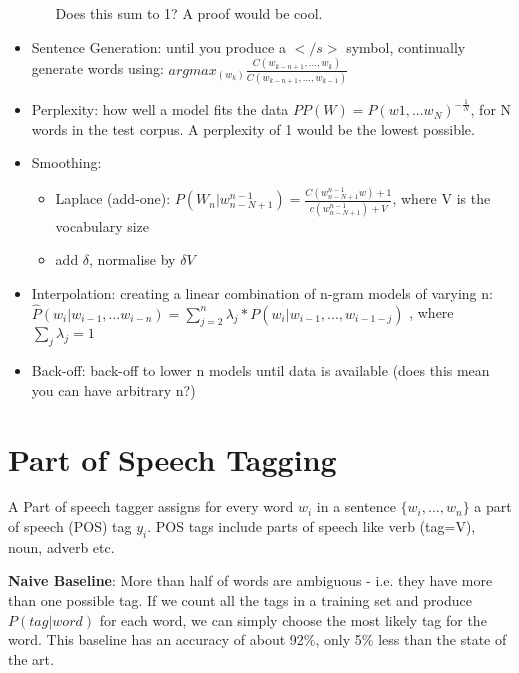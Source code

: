 \documentclass[]{article}
\begin{document}
\begin{itemize}
\begin{itemize}
				Does this sum to 1? A proof would be cool.
				
			\end{itemize}
		
		\item Sentence Generation: until you produce a $</s>$ symbol, continually generate words using: $argmax_(w_k) \frac{C(w_{k-n+1},...,w_k)}{C(w_{k-n+1},...,w_{k-1})}$ 
		
		\item Perplexity: how well a model fits the data $PP(W) = P(w1,...w_N)^{-\frac{1}{N}}$, for N words in the test corpus. A perplexity of 1 would be the lowest possible.
		
		\item Smoothing: 
		
			\begin{itemize}
				\item Laplace (add-one): $P(W_n | w_{n - N + 1}^{n-1}) = \frac{C( w_{n - N + 1}^{n-1}w) + 1}{c( w_{n - N + 1}^{n-1}) + V}$, where V is the vocabulary size
				
				\item add $\delta$, normalise by $\delta V$
			
			\end{itemize}
		
	\item Interpolation: creating a linear combination of n-gram models of varying n: $\hat{P}(w_i | w_{i-1},...w_{i-n}) = \sum_{j=2}^{n} \lambda_j * P(w_i | w_{i-1},...,w_{i-1-j})$ , where $\sum_{j}\lambda_j = 1$ 
	
	\item Back-off: back-off to lower n models until data is available (does this mean you can have arbitrary n?)
	
	\end{itemize}
	
	
	
	\clearpage
	\section{Part of Speech Tagging}
	
	A Part of speech tagger assigns for every word $w_i$ in a sentence $\{w_i, ..., w_n\}$ a part of speech (POS) tag $y_i$. POS tags include parts of speech like verb (tag=V), noun, adverb etc.
	
	\textbf{Naive Baseline}: More than half of words are ambiguous - i.e. they have more than one possible tag. If we count all the tags in a training set and produce $P(tag | word)$ for each word, we can simply choose the most likely tag for the word. This baseline has an accuracy of about 92\%, only 5\% less than the state of the art. 
	
\end{document}
